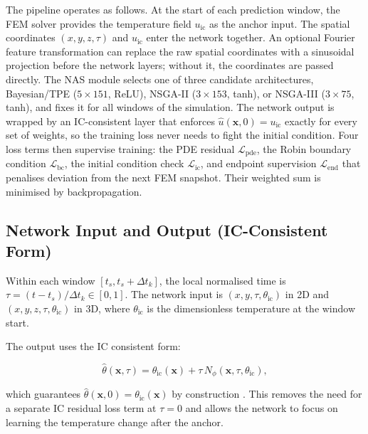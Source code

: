The pipeline operates as follows.
At the start of each prediction window, the FEM solver provides the
temperature field $u_\mathrm{ic}$ as the anchor input.
The spatial coordinates $(x, y, z, \tau)$ and $u_\mathrm{ic}$ enter the
network together.
An optional Fourier feature transformation can replace the raw spatial
coordinates with a sinusoidal projection before the network layers; without
it, the coordinates are passed directly.
The NAS module selects one of three candidate architectures, Bayesian/TPE
($5{\times}151$, ReLU), NSGA-II ($3{\times}153$, tanh), or NSGA-III
($3{\times}75$, tanh), and fixes it for all windows of the simulation.
The network output is wrapped by an IC-consistent layer that enforces
$\hat{u}(\mathbf{x},0) = u_\mathrm{ic}$ exactly for every set of weights,
so the training loss never needs to fight the initial condition.
Four loss terms then supervise training: the PDE residual
$\mathcal{L}_\mathrm{pde}$, the Robin boundary condition
$\mathcal{L}_\mathrm{bc}$, the initial condition check
$\mathcal{L}_\mathrm{ic}$, and endpoint supervision
$\mathcal{L}_\mathrm{end}$ that penalises deviation from the next FEM
snapshot.
Their weighted sum is minimised by backpropagation.

\subsection{Network Input and Output (IC-Consistent Form)}

Within each window $[t_s, t_s+\Delta t_k]$, the local normalised time is
$\tau = (t-t_s)/\Delta t_k \in [0,1]$.
The network input is $(x, y, \tau, \theta_\mathrm{ic})$ in 2D and
$(x, y, z, \tau, \theta_\mathrm{ic})$ in 3D, where $\theta_\mathrm{ic}$ is
the dimensionless temperature at the window start.

The output uses the IC consistent form:

\begin{equation}
\hat\theta(\mathbf{x},\tau)
= \theta_\mathrm{ic}(\mathbf{x}) + \tau\,N_\phi(\mathbf{x},\tau,\theta_\mathrm{ic}),
\label{eq:ic_form}
\end{equation}

which guarantees $\hat\theta(\mathbf{x},0)=\theta_\mathrm{ic}(\mathbf{x})$
by construction \cite{lagaris1998}.
This removes the need for a separate IC residual loss term at $\tau=0$ and
allows the network to focus on learning the temperature change after the
anchor.


